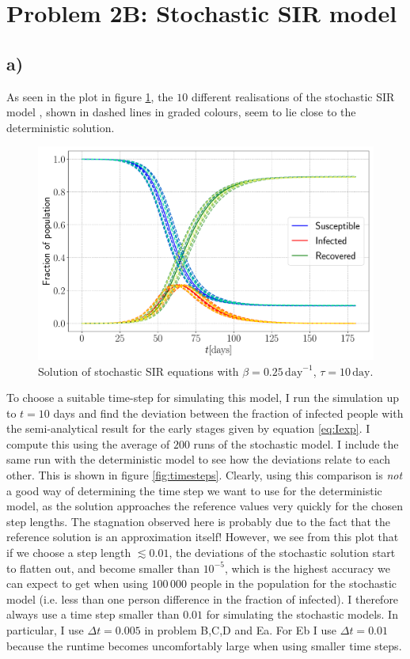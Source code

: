 \section{Problem 2B: Stochastic SIR model}

\subsection{a)}

As seen in the plot in figure \ref{fig:SIR_stoch}, the $10$ different realisations of the stochastic SIR model , shown in dashed lines in graded colours, seem to lie close to the deterministic solution.

\begin{figure}[htb]
	\centering
	\includegraphics[width=0.8\columnwidth]{../fig/2Ba_SIR.pdf}
	\caption{Solution of stochastic SIR equations with $\beta = 0.25\, \mathrm{day}^{-1}$, $\tau = 10\, \mathrm{day}$.}
	\label{fig:SIR_stoch}
\end{figure}

To choose a suitable time-step for simulating this model, I run the simulation up to $t = 10$ days and find the deviation between the fraction of infected people with the semi-analytical result for the early stages given by equation \ref{eq:Iexp}. I compute this using the average of $200$ runs of the stochastic model. I include the same run with the deterministic model to see how the deviations relate to each other. This is shown in figure \ref{fig:timesteps}. Clearly, using this comparison is \textit{not} a good way of determining the time step we want to use for the deterministic model, as the solution approaches the reference values very quickly for the chosen step lengths. The stagnation observed here is probably due to the fact that the reference solution is an approximation itself! However, we see from this plot that if we choose a step length $\lesssim 0.01$, the deviations of the stochastic solution start to flatten out, and become smaller than $10^{-5}$, which is the highest accuracy we can expect to get when using $100\,000$ people in the population for the stochastic model (i.e. less than one person difference in the fraction of infected). I therefore always use a time step smaller than $0.01$ for simulating the stochastic models. In particular, I use $\Delta t = 0.005$ in problem B,C,D and Ea. For Eb I use $\Delta t = 0.01$ because the runtime becomes uncomfortably large when using smaller time steps.

